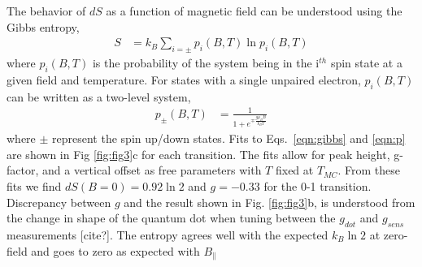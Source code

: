 \documentclass[preprint,showpacs,preprintnumbers,amsmath,amssymb,pra,aps,superscriptaddress]{revtex4-1}
\begin{document}
The behavior of $dS$ as a function of magnetic field can be understood using the Gibbs entropy,
%
\begin{align}
\label{eqn:gibbs}
        S &= k_B \sum_{i=\pm} p_{i}(B, T) \ln{ p_{i}(B,T) }
\end{align}
%
where $p_{i}(B, T)$ is the probability of the system being in the i$^{th}$ spin state at a given field and temperature.  For states with a single unpaired electron, $p_{i}(B, T)$ can be written as a two-level system,
%
\begin{align}
\label{eqn:p}
        p_{\pm}(B, T) &= \frac{1}{1+ e^{\mp \frac{g\mu_B B}{k_B T}}}
\end{align}
%
where $\pm$ represent the spin up/down states. Fits to Eqs.~\ref{eqn:gibbs} and \ref{eqn:p} are shown in Fig \ref{fig:fig3}c for each transition. The fits allow for peak height, g-factor, and a vertical offset as free parameters with $T$ fixed at $T_{MC}$. From these fits we find $dS(B=0)=0.92 \ln{2}$ and $g=-0.33$ for the 0-1 transition.  Discrepancy between $g$ and the result shown in Fig. \ref{fig:fig3}b, is understood from the change in shape of the quantum dot when tuning between the $g_{dot}$ and $g_{sens}$ measurements [cite?]. The entropy agrees well with the expected $k_{B} \ln{2}$ at zero-field and goes to zero as expected with $B_{\parallel}$
\end{document}
